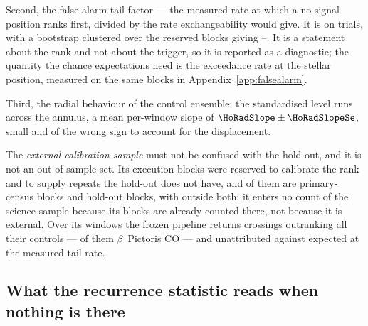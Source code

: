 Second, the false-alarm tail factor --- the measured rate at which a
no-signal position ranks first, divided by the rate exchangeability would
give. It is \HoTailFactor{} on \HoPseudoTrials{} trials, with a bootstrap
clustered over the \HoTailBlocks{} reserved blocks giving
\HoTailLo--\HoTailHi. It is a statement about the rank and not about the
trigger, so it is reported as a diagnostic; the quantity the chance
expectations need is the exceedance rate at the stellar position, measured
on the same blocks in Appendix~\ref{app:falsealarm}.

Third, the radial behaviour of the control ensemble: the standardised level
runs \HoRadBins{} across the annulus, a mean per-window slope of
$\HoRadSlope\pm\HoRadSlopeSe$, small and of the wrong sign to account for the
displacement.

The \emph{external calibration sample} must not be confused with the
hold-out, and it is not an out-of-sample set. Its \CampBlocks{} execution
blocks were reserved to calibrate the rank and to supply repeats the hold-out
does not have, and \CalNCensus{} of them are primary-census blocks and
\CalNHoldout{} hold-out blocks, with \CalNOutside{} outside both: it enters no
count of the science sample because its blocks are already counted there, not
because it is external. Over its \CampWindows{} windows the frozen pipeline
returns \CampStageOne{} crossings outranking all their controls ---
\CampStageOneCO{} of them $\beta$~Pictoris CO --- and \CampUnattrib{}
unattributed against \CampExpUn{} expected at the measured tail rate.

\subsection{What the recurrence statistic reads when nothing is there}

